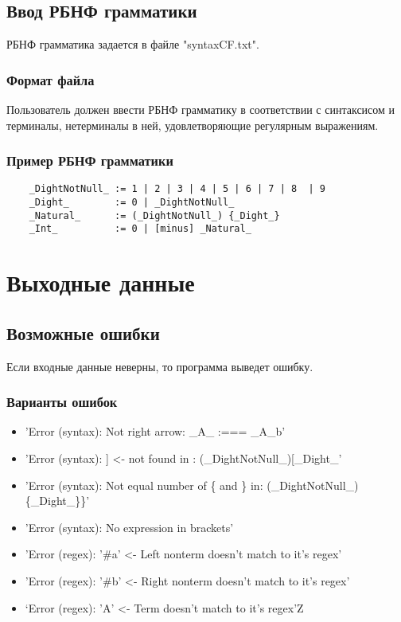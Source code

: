 \documentclass[12pt]{article}
\begin{document}


    \hfill
    \subsection{Ввод РБНФ грамматики}

    РБНФ грамматика задается в файле "syntaxCF.txt".

    \subsubsection*{Формат файла}
    Пользователь должен ввести РБНФ грамматику в соответствии с синтаксисом и терминалы, нетерминалы в ней, удовлетворяющие регулярным выражениям.

    \subsubsection*{Пример РБНФ грамматики}
    \begin{lstlisting}
    _DightNotNull_ := 1 | 2 | 3 | 4 | 5 | 6 | 7 | 8  | 9
    _Dight_        := 0 | _DightNotNull_
    _Natural_      := (_DightNotNull_) {_Dight_}
    _Int_          := 0 | [minus] _Natural_
    \end{lstlisting}

    \clearpage


    \section{Выходные данные}

    \subsection{Возможные ошибки}

    Если входные данные неверны, то программа выведет ошибку.

    \subsubsection*{Варианты ошибок}
    \begin{itemize}
        \item 'Error (syntax): Not right arrow: \_A\_ :=== \_A\_b'
        \item 'Error (syntax): ] <- not found in : (\_DightNotNull\_)[\_Dight\_'
        \item 'Error (syntax): Not equal number of \{ and \}   in: (\_DightNotNull\_)\{\_Dight\_\}\}'
        \item 'Error (syntax): No expression in brackets'
        \item 'Error (regex): '\#a' <- Left nonterm doesn't match to it's regex'
        \item 'Error (regex): '\#b' <- Right nonterm doesn't match to it's regex'
        \item ‘Error (regex): 'A' <- Term doesn't match to it's regex’Z
    \end{itemize}
\end{document}
